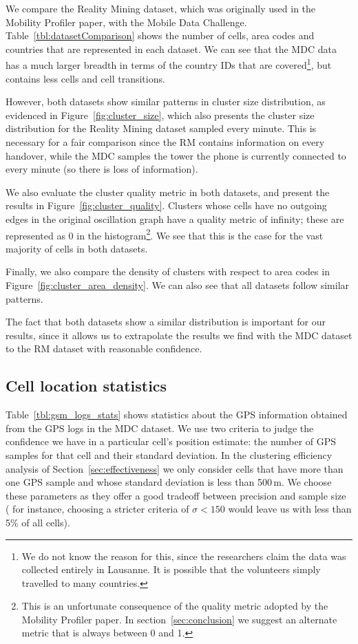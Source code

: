 \documentclass[letterpaper, 12pt, conference]{ieeeconf}
\begin{document}
We compare the Reality Mining dataset, which was originally used in the 
Mobility Profiler paper, with the Mobile Data Challenge.
Table~\ref{tbl:datasetComparison} shows the number of cells, area codes and countries 
that are represented in each dataset. We can see that the MDC data has a much 
larger breadth in terms of the country IDs that are covered\footnote{We do 
not know the reason for this, since the researchers claim the data was 
collected entirely in Lausanne. It is possible that the volunteers simply 
travelled to many countries.}, but contains less cells and cell transitions.

However, both datasets show similar patterns in cluster size distribution, as 
evidenced in Figure~\ref{fig:cluster_size}, which also presents the cluster 
size distribution for the Reality Mining dataset sampled every minute. This 
is necessary for a fair comparison since the RM contains information on every 
handover, while the MDC samples the tower the phone is currently connected to 
every minute (so there is loss of information).

We also evaluate the cluster quality metric in both datasets, and 
present the results in Figure~\ref{fig:cluster_quality}. Clusters whose cells 
have no outgoing edges in the original oscillation graph have a quality 
metric of infinity; these are represented as 0 in the histogram\footnote{This 
is an unfortunate consequence of the quality metric adopted by the Mobility 
Profiler paper. In section~\ref{sec:conclusion} we suggest an alternate 
metric that is always between 0 and 1.}. We see that this is the case for the 
vast majority of cells in both datasets.

Finally, we also compare the density of clusters with respect to area codes 
in Figure~\ref{fig:cluster_area_density}. We can also see that all datasets 
follow similar patterns.

The fact that both datasets show a similar distribution is important for our 
results, since it allows us to extrapolate the results we find with the MDC 
dataset to the RM dataset with reasonable confidence.

\subsection{Cell location statistics}
\label{sec:location_stats}

Table~\ref{tbl:gsm_logs_stats} shows statistics about the GPS 
information obtained from the GPS logs in the MDC dataset. We use two 
criteria to judge the confidence we have in a particular cell's position 
estimate: the number of GPS samples for that cell and their standard 
deviation. In the clustering efficiency analysis of
Section~\ref{sec:effectiveness} we only consider cells that have more than one GPS sample 
and whose standard deviation is less than 500\,m. We choose these 
parameters as they offer a good tradeoff between precision and sample size (
for instance, choosing a stricter criteria of $\sigma < 150$ would leave us 
with less than 5\% of all cells).
\end{document}
